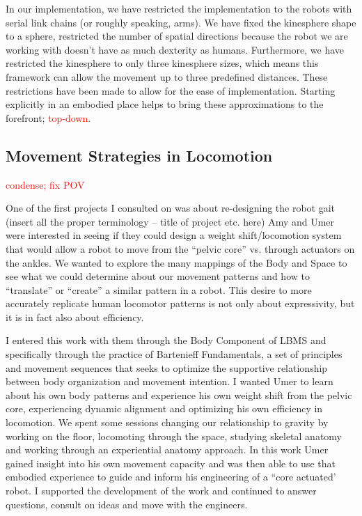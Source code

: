 \documentclass[arts,article,submit,moreauthors,pdftex,10pt,a4paper]{mdpi}
\begin{document}
In our implementation, we have restricted the implementation to the robots with serial link chains (or roughly speaking, arms).  We have fixed the kinesphere shape to a sphere, restricted the number of spatial directions because the robot we are working with doesn’t have as much dexterity as humans. Furthermore, we have restricted the kinesphere to only three kinesphere sizes, which means this framework can allow the movement up to three predefined distances. These restrictions have been made to allow for the ease of implementation.  Starting explicitly in an embodied place helps to bring these approximations to the forefront; \textcolor{red}{top-down}.


\subsection{Movement Strategies in Locomotion}
\textcolor{red}{condense; fix POV}

One of the first projects I consulted on was about re-designing the robot gait (insert all the proper terminology – title of project etc. here) Amy and Umer were interested in seeing if they could design a weight shift/locomotion system that would allow a robot to move from the “pelvic core” vs. through actuators on the ankles. We wanted to explore the many mappings of the Body and Space to see what we could determine about our movement patterns and how to “translate” or “create” a similar pattern in a robot. This desire to more accurately replicate human locomotor patterns is not only about expressivity, but it is in fact also about efficiency. 

I entered this work with them through the Body Component of LBMS and specifically through the practice of Bartenieff Fundamentals, a set of principles and movement sequences that seeks to optimize the supportive relationship between body organization and movement intention. I wanted Umer to learn about his own body patterns and experience his own weight shift from the pelvic core, experiencing dynamic alignment and optimizing his own efficiency in locomotion. We spent some sessions changing our relationship to gravity by working on the floor, locomoting through the space, studying skeletal anatomy and working through an experiential anatomy approach. In this work Umer gained insight into his own movement capacity and was then able to use that embodied experience to guide and inform his engineering of a “core actuated’ robot. I supported the development of the work and continued to answer questions, consult on ideas and move with the engineers.
\end{document}
